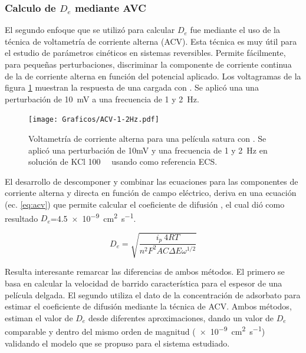 	 \subsubsection*{Calculo de $D_e$ mediante AVC}

    	 El segundo enfoque que se utilizó para calcular $D_e$ fue mediante el uso de la técnica de voltametría de corriente alterna (ACV). Esta técnica es muy útil para el estudio de parámetros cinéticos en sistemas reversibles. Permite fácilmente, para pequeñas perturbaciones, discriminar la componente de corriente continua de la de corriente alterna en función del potencial aplicado. Los voltagramas de la figura \ref{fig:acv} muestran la respuesta de una \pdmF\space cargada con \ru. Se aplicó una una perturbación de \SI{10}{\milli\volt} a una frecuencia de 1 y \SI{2}{\hertz}.

	 			\begin{figure}[b!]
					\centering
			 	    \texttt{[image: Graficos/ACV-1-2Hz.pdf]}
			        \caption[Voltametrías de corriente alterna]{Voltametría de corriente alterna para una película satura con \ru. Se aplicó una perturbación de 10mV y una frecuencia de 1 y \SI{2}{\hertz} en solución de KCl \SI{100}{\milli\Molar} usando como referencia ECS.}
			        \label{fig:acv}
			      	\end{figure}

    	 El desarrollo de descomponer y combinar las ecuaciones para las componentes de corriente alterna y directa en función de campo eléctrico, deriva en una ecuación (ec. \ref{eq:acv}) que permite calcular el coeficiente de difusión \cite{Wi2000}, el cual dió como resultado $D_e$=\SI{4.5e-9}{\square\cm\per\second}. 
    	 	
    	 		\begin{equation}
					D_e=\sqrt{\frac{i_p\ 4RT}{n^2 F^2 A C \Delta E \omega ^{1/2}}}
					\label{eq:acv}
				 \end{equation}

		
		 Resulta interesante remarcar las diferencias de ambos métodos. El primero se basa en calcular la velocidad de barrido característica para el espesor de una película delgada. El segundo utiliza el dato de la concentración de adsorbato para estimar el coeficiente de difusión mediante la técnica de ACV. Ambos métodos, estiman el valor de $D_e$ desde diferentes aproximaciones, dando un valor de $D_e$ comparable y dentro del mismo orden de magnitud (\SI{e-9}{\square\cm\per\second}) validando el modelo que se propuso para el sistema estudiado.
			
